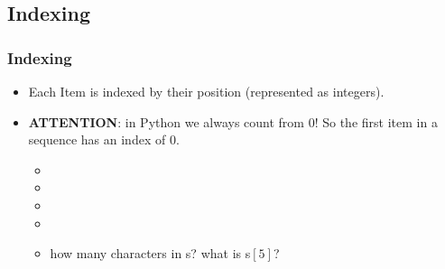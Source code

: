 \documentclass[xcolor={usenames, dvipsnames}, hyperref={colorlinks,linkcolor=black, urlcolor=blue}]{beamer}
\begin{document}

\subsection{Indexing} 
\begin{frame}
\frametitle{Indexing}

\begin{itemize}
\item Each Item is indexed by their position (represented as integers).
\end{itemize}

\begin{itemize}
\item \textbf {ATTENTION}: in Python we always count from 0! So the first item in a sequence has an index of 0.
	\begin{itemize}
	\item {}
	\item {}
	\item {}
	\item {}
	\item how many characters in s? what is s$[5]$?
	\end{itemize}
\end{itemize}
\end{frame}

\end{document}
